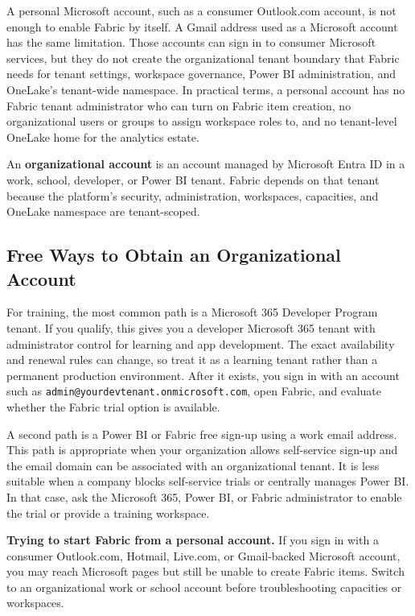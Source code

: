A personal Microsoft account, such as a consumer Outlook.com account, is not enough to enable Fabric by itself. A Gmail address used as a Microsoft account has the same limitation. Those accounts can sign in to consumer Microsoft services, but they do not create the organizational tenant boundary that Fabric needs for tenant settings, workspace governance, Power BI administration, and OneLake's tenant-wide namespace. In practical terms, a personal account has no Fabric tenant administrator who can turn on Fabric item creation, no organizational users or groups to assign workspace roles to, and no tenant-level OneLake home for the analytics estate.

\begin{definitionbox}
An \textbf{organizational account} is an account managed by Microsoft Entra ID in a work, school, developer, or Power BI tenant. Fabric depends on that tenant because the platform's security, administration, workspaces, capacities, and OneLake namespace are tenant-scoped.
\end{definitionbox}

\subsection{Free Ways to Obtain an Organizational Account}
For training, the most common path is a Microsoft 365 Developer Program tenant. If you qualify, this gives you a developer Microsoft 365 tenant with administrator control for learning and app development. The exact availability and renewal rules can change, so treat it as a learning tenant rather than a permanent production environment. After it exists, you sign in with an account such as \texttt{admin@yourdevtenant.onmicrosoft.com}, open Fabric, and evaluate whether the Fabric trial option is available.

A second path is a Power BI or Fabric free sign-up using a work email address. This path is appropriate when your organization allows self-service sign-up and the email domain can be associated with an organizational tenant. It is less suitable when a company blocks self-service trials or centrally manages Power BI. In that case, ask the Microsoft 365, Power BI, or Fabric administrator to enable the trial or provide a training workspace.

\begin{pitfall}
\textbf{Trying to start Fabric from a personal account.} If you sign in with a consumer Outlook.com, Hotmail, Live.com, or Gmail-backed Microsoft account, you may reach Microsoft pages but still be unable to create Fabric items. Switch to an organizational work or school account before troubleshooting capacities or workspaces.
\end{pitfall}

